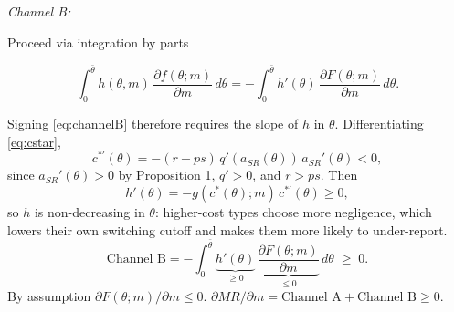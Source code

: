 \documentclass{article}
\begin{document}
	
	\textit{Channel B:}    
    

     Proceed via integration by parts
	

	\begin{equation}\label{eq:channelB}
		\int_0^{\bar\theta} h(\theta,m)\,\frac{\partial f(\theta;m)}{\partial m}\, d\theta = -\int_0^{\bar\theta} h'(\theta)\,\frac{\partial F(\theta;m)}{\partial m}\, d\theta.
	\end{equation}
    
    Signing \eqref{eq:channelB} therefore requires the slope of $h$ in $\theta$. Differentiating \eqref{eq:cstar},
	\[
	c^{*\prime}(\theta) = -(r-ps)\,q'(a_{SR}(\theta))\,a_{SR}'(\theta) < 0,
	\]
	since $a_{SR}'(\theta) > 0$ by Proposition 1, $q' > 0$, and $r > ps$. Then
	\[
	h'(\theta) = -g(c^*(\theta);m)\,c^{*\prime}(\theta) \ge 0,
	\]
	so $h$ is non-decreasing in $\theta$: higher-cost types choose more negligence, which lowers their own switching cutoff and makes them more likely to under-report.
	\[
	\text{Channel B} = -\int_0^{\bar\theta} \underbrace{h'(\theta)}_{\ge 0}\,\underbrace{\frac{\partial F(\theta;m)}{\partial m}}_{\le 0}\, d\theta \;\ge\; 0.
	\]
	By assumption $\partial F(\theta;m)/\partial m \le 0$.
	$\partial MR/\partial m = \text{Channel A} + \text{Channel B} \ge 0$. 
    
\end{document}
